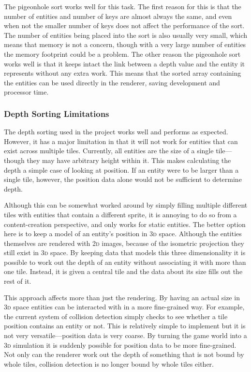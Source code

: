 The pigeonhole sort works well for this task. The first reason for this is that the number of entities and number of keys are almost always the same, and even when not the smaller number of keys does not affect the performance of the sort. The number of entities being placed into the sort is also usually very small, which means that memory is not a concern, though with a very large number of entities the memory footprint could be a problem. The other reason the pigeonhole sort works well is that it keeps intact the link between a depth value and the entity it represents without any extra work. This means that the sorted array containing the entities can be used directly in the renderer, saving development and processor time.

\subsubsection{Depth Sorting Limitations}\label{depth_limits}
The depth sorting used in the project works well and performs as expected. However, it has a major limitation in that it will not work for entities that can exist across multiple tiles. Currently, all entities are the size of a single tile---though they may have arbitrary height within it. This makes calculating the depth a simple case of looking at position. If an entity were to be larger than a single tile, however, the position data alone would not be sufficient to determine depth.

Although this can be somewhat worked around by simply filling multiple different tiles with entities that contain a different sprite, it is annoying to do so from a content-creation perspective, and only works for static entities. The better option here is to keep a model of an entity's position in \textsc{3d} space. Although the entities themselves are rendered with \textsc{2d} images, because of the isometric projection they still exist in \textsc{3d} space. By keeping data that models this three dimensionality it is possible to work out the depth of an entity without associating it with more than one tile. Instead, it is given a central tile and the data about its size fills out the rest of it.

This approach affects more than just the rendering. By having an actual size in \textsc{3d} space entities can be interacted with in a more fine-grained way. For example, the current system of collision detection simply checks to see whether a tile position contains an entity or not. This is relatively simple to implement but it is not very versatile---position data is very coarse. By turning the game world into a \textsc{3d} simulation it is suddenly possible for position data to be more fine-grained. Not only can the renderer work out the depth of something that is not bound by whole tiles, collision detection is no longer bound by whole tiles either.

